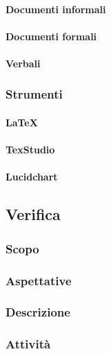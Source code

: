 		\paragraph{Documenti informali}
		\paragraph{Documenti formali}
		\paragraph{Verbali}
	\subsubsection{Strumenti}
		\paragraph{\LaTeX}
		\paragraph{TexStudio}
		\paragraph{Lucidchart}
	
\subsection{Verifica}

	\subsubsection{Scopo}
	\subsubsection{Aspettative}
	\subsubsection{Descrizione}
	\subsubsection{Attività}
